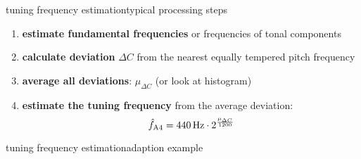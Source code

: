        \begin{frame}{tuning frequency estimation}{typical processing steps}
            \begin{enumerate}
                \item   \textbf{estimate fundamental frequencies} or frequencies of tonal components
                \smallskip
                \item<2->   \textbf{calculate deviation} $\Delta C$ from the nearest equally tempered pitch frequency
                \smallskip
                \item<3->   \textbf{average all deviations}: $\mu_{\Delta C}$ (or look at histogram)
                \smallskip
                \item<4->   \textbf{estimate the tuning frequency} from the average deviation:
                \[ \hat{f}_\mathrm{A4} = \unit[440]{Hz}\cdot 2^\frac{\mu_{\Delta C}}{1200}\]
                    
            \end{enumerate}
       \end{frame}
       \begin{frame}{tuning frequency estimation}{adaption example}
            \vspace{-3mm}
            
       \end{frame}
     

